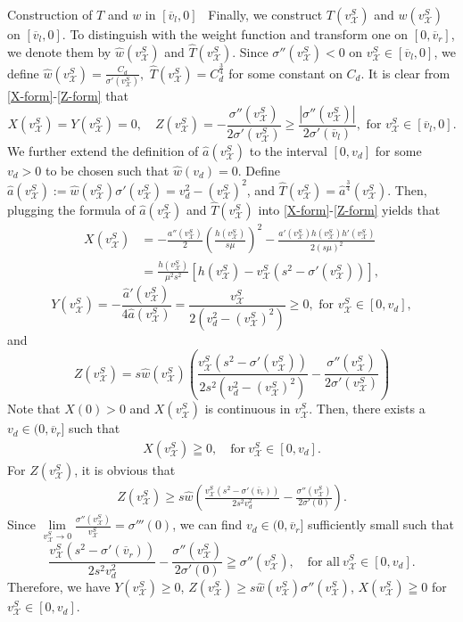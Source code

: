 \documentclass[12pt,reqno]{amsart}
\numberwithin{equation}{section}
\def\th{\hat{T}}
\def\wh{\hat{w}}
\def\vsx{v^S_{\mathcal{X}}}
\def\avl{\overline{v}_l}
\def\avr{\overline{v}_r}
\begin{document}
\begin{part}{Construction of $T$ and $w$ in $[\avl,0]$}
	\
	Finally, we construct  $T(\vsx)$ and $w(\vsx)$ on  $[\avl,0]$. To distinguish with the weight function and transform one on $[0,\avr]$, we denote them by $\wh(\vsx)$ and $\th(\vsx)$. Since $\sigma''(\vsx)<0$ on $\vsx\in[\avl,0]$, we define $\wh(\vsx)=\frac{C_d}{\sigma'(\vsx)},$ $\th(\vsx)=C_d^{\frac{3}{4}}$ for some constant on $C_d$. It is clear from \eqref{X-form}-\eqref{Z-form} that
	 \begin{equation}
	 	X(\vsx)=Y(\vsx)=0,\quad Z(\vsx)=-\frac{\sigma''(\vsx)}{2\sigma'(\vsx)}\geq \frac{|\sigma''(\vsx)|}{2\sigma'(\avl)},\text{ for }\vsx\in[\avl,0].
	 \end{equation} 
	We further extend the definition of $\hat{a}(\vsx)$ to the interval $[0,v_d]$ for some $v_d>0$ to be chosen such that $\wh(v_d)=0$.
	Define $\hat{a}(\vsx):=\wh(\vsx)\sigma'(\vsx)=v_d^2-(\vsx)^2$, and $\th(\vsx)=\hat{a}^{\frac{3}{4}}(\vsx)$.
	Then, plugging the formula of $\hat{a}(\vsx)$ and $\th(\vsx)$ into \eqref{X-form}-\eqref{Z-form} yields that
	\begin{equation}
		\begin{aligned}
			X(\vsx)&=-\frac{a''(\vsx)}{2}(\frac{h(\vsx)}{s\mu})^2-\frac{a'(\vsx)h(\vsx)h'(\vsx)}{2(s\mu)^2}\\
			&=\frac{h(\vsx)}{\mu ^2s^2}[h(\vsx)-\vsx(s^2-\sigma'(\vsx))],
		\end{aligned}
	\end{equation}
	\begin{equation}
		Y(\vsx)=-\frac{\hat{a}'(\vsx)}{4\hat{a}(\vsx)}=\frac{\vsx}{2(v_d^2-(\vsx)^2)}\geq 0,\text{ for }\vsx\in[0,v_d],
	\end{equation}
and
	\begin{equation}
		Z(\vsx)=s\wh(\vsx)\left(\frac{\vsx(s^2-\sigma'(\vsx))}{2s^2(v_d^2-(\vsx)^2)}-\frac{\sigma''(\vsx)}{2\sigma'(\vsx)}\right)
	\end{equation}
	Note that $X(0)>0$ and $X(\vsx)$ is continuous in $\vsx$. Then, there exists a $v_d \in (0,\avr]$ such that 
	\begin{align*}
		X (\vsx)\geqq 0, \quad \text{for}~\vsx \in [0,v_d].
	\end{align*}
For $Z(\vsx)$, it is obvious that
\begin{align*}
	Z(\vsx)\geq s\wh\left(\frac{\vsx(s^2-\sigma'(\avr))}{2s^2v_d^2}-\frac{\sigma''(\vsx)}{2\sigma'(0)}\right).
\end{align*}
	Since $\mathop{lim}\limits_{\vsx \to 0}\frac{\sigma''(\vsx)}{\vsx} = \sigma'''(0)$, we can find $v_d \in (0,\avr]$ sufficiently small such that 
	\begin{equation}\label{hatc1}
			\frac{\vsx(s^2-\sigma'(\avr))}{2s^2v_d^2}-\frac{\sigma''(\vsx)}{2\sigma'(0)}\geqq\sigma''(\vsx), \quad \text{for all}~\vsx \in [0,v_d].
	\end{equation}
	Therefore, we have $Y(\vsx)\geq0$, $Z(\vsx)\geq s\wh(\vsx)\sigma''(\vsx)$, $X(\vsx)\geqq 0$ for $\vsx \in [0,v_d]$.
	

\end{part}
\end{document}
